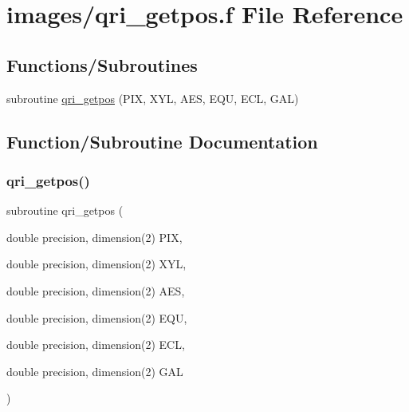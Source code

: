 \hypertarget{qri__getpos_8f}{}\section{images/qri\+\_\+getpos.f File Reference}
\label{qri__getpos_8f}
\subsection*{Functions/\+Subroutines}
\begin{DoxyCompactItemize}
\item 
subroutine \hyperlink{qri__getpos_8f_aae01753fd73d2df13b0cc8c54edffe0d}{qri\+\_\+getpos} (P\+IX, X\+YL, A\+ES, E\+QU, E\+CL, G\+AL)
\end{DoxyCompactItemize}


\subsection{Function/\+Subroutine Documentation}
\mbox{\label{qri__getpos_8f_aae01753fd73d2df13b0cc8c54edffe0d}} 
\subsubsection{\texorpdfstring{qri\+\_\+getpos()}{qri\_getpos()}}
{\footnotesize\ttfamily subroutine qri\+\_\+getpos (\begin{DoxyParamCaption}\item[{double precision, dimension(2)}]{P\+IX,  }\item[{double precision, dimension(2)}]{X\+YL,  }\item[{double precision, dimension(2)}]{A\+ES,  }\item[{double precision, dimension(2)}]{E\+QU,  }\item[{double precision, dimension(2)}]{E\+CL,  }\item[{double precision, dimension(2)}]{G\+AL }\end{DoxyParamCaption})}

